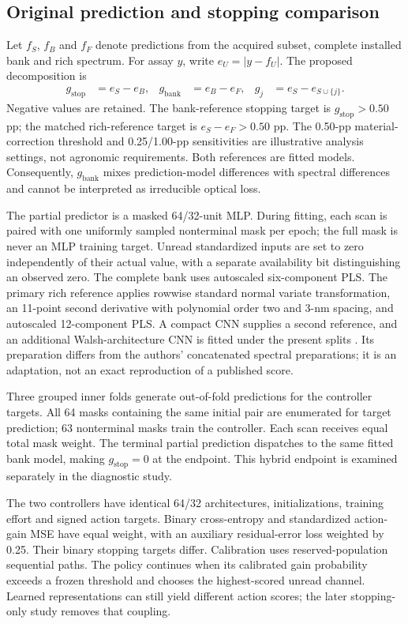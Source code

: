 \documentclass[11pt,a4paper]{article}
\begin{document}
\subsection{Original prediction and stopping comparison}
Let $f_S$, $f_B$ and $f_F$ denote predictions from the acquired subset, complete installed bank and rich spectrum. For assay $y$, write $e_U=|y-f_U|$. The proposed decomposition is
\begin{align}
g_{\mathrm{stop}}&=e_S-e_B, & g_{\mathrm{bank}}&=e_B-e_F, &
g_j&=e_S-e_{S\cup\{j\}}.
\end{align}
Negative values are retained. The bank-reference stopping target is $g_{\mathrm{stop}}>0.50$ pp; the matched rich-reference target is $e_S-e_F>0.50$ pp. The 0.50-pp material-correction threshold and 0.25/1.00-pp sensitivities are illustrative analysis settings, not agronomic requirements. Both references are fitted models. Consequently, $g_{\mathrm{bank}}$ mixes prediction-model differences with spectral differences and cannot be interpreted as irreducible optical loss.

The partial predictor is a masked 64/32-unit MLP. During fitting, each scan is paired with one uniformly sampled nonterminal mask per epoch; the full mask is never an MLP training target. Unread standardized inputs are set to zero independently of their actual value, with a separate availability bit distinguishing an observed zero. The complete bank uses autoscaled six-component PLS. The primary rich reference applies rowwise standard normal variate transformation, an 11-point second derivative with polynomial order two and 3-nm spacing, and autoscaled 12-component PLS. A compact CNN supplies a second reference, and an additional Walsh-architecture CNN is fitted under the present splits \citep{walsh2024,walshthesis2024}. Its preparation differs from the authors' concatenated spectral preparations; it is an adaptation, not an exact reproduction of a published score.

Three grouped inner folds generate out-of-fold predictions for the controller targets. All 64 masks containing the same initial pair are enumerated for target prediction; 63 nonterminal masks train the controller. Each scan receives equal total mask weight. The terminal partial prediction dispatches to the same fitted bank model, making $g_{\mathrm{stop}}=0$ at the endpoint. This hybrid endpoint is examined separately in the diagnostic study.

The two controllers have identical 64/32 architectures, initializations, training effort and signed action targets. Binary cross-entropy and standardized action-gain MSE have equal weight, with an auxiliary residual-error loss weighted by 0.25. Their binary stopping targets differ. Calibration uses reserved-population sequential paths. The policy continues when its calibrated gain probability exceeds a frozen threshold and chooses the highest-scored unread channel. Learned representations can still yield different action scores; the later stopping-only study removes that coupling.
\end{document}
